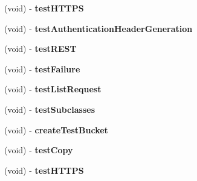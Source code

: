 \begin{DoxyCompactItemize}
\item 
\hypertarget{interface_a_s_i_s3_request_tests_ab3c1fecc3be8fa9465a8e7a20de1f49e}{
(void) -\/ {\bfseries test\-H\-T\-T\-P\-S}}
\label{interface_a_s_i_s3_request_tests_ab3c1fecc3be8fa9465a8e7a20de1f49e}

\item 
\hypertarget{interface_a_s_i_s3_request_tests_a60bdada8e76611d7d565dff4b2cfd8a9}{
(void) -\/ {\bfseries test\-Authentication\-Header\-Generation}}
\label{interface_a_s_i_s3_request_tests_a60bdada8e76611d7d565dff4b2cfd8a9}

\item 
\hypertarget{interface_a_s_i_s3_request_tests_a8ca48a7b94614a7026f7b7862b722f89}{
(void) -\/ {\bfseries test\-R\-E\-S\-T}}
\label{interface_a_s_i_s3_request_tests_a8ca48a7b94614a7026f7b7862b722f89}

\item 
\hypertarget{interface_a_s_i_s3_request_tests_a91778029a97f36e77dad559977cdb550}{
(void) -\/ {\bfseries test\-Failure}}
\label{interface_a_s_i_s3_request_tests_a91778029a97f36e77dad559977cdb550}

\item 
\hypertarget{interface_a_s_i_s3_request_tests_adf56486c5a0e74cfdf0711c5fa016fb9}{
(void) -\/ {\bfseries test\-List\-Request}}
\label{interface_a_s_i_s3_request_tests_adf56486c5a0e74cfdf0711c5fa016fb9}

\item 
\hypertarget{interface_a_s_i_s3_request_tests_a7d8d7e21e0b483ca67889868688adb7d}{
(void) -\/ {\bfseries test\-Subclasses}}
\label{interface_a_s_i_s3_request_tests_a7d8d7e21e0b483ca67889868688adb7d}

\item 
\hypertarget{interface_a_s_i_s3_request_tests_a8cc7c1272f528811ee7d8f5e07fb1133}{
(void) -\/ {\bfseries create\-Test\-Bucket}}
\label{interface_a_s_i_s3_request_tests_a8cc7c1272f528811ee7d8f5e07fb1133}

\item 
\hypertarget{interface_a_s_i_s3_request_tests_a47ba82f8750aba0ef3928d442442e5c8}{
(void) -\/ {\bfseries test\-Copy}}
\label{interface_a_s_i_s3_request_tests_a47ba82f8750aba0ef3928d442442e5c8}

\item 
\hypertarget{interface_a_s_i_s3_request_tests_ab3c1fecc3be8fa9465a8e7a20de1f49e}{
(void) -\/ {\bfseries test\-H\-T\-T\-P\-S}}
\label{interface_a_s_i_s3_request_tests_ab3c1fecc3be8fa9465a8e7a20de1f49e}


\end{DoxyCompactItemize}
